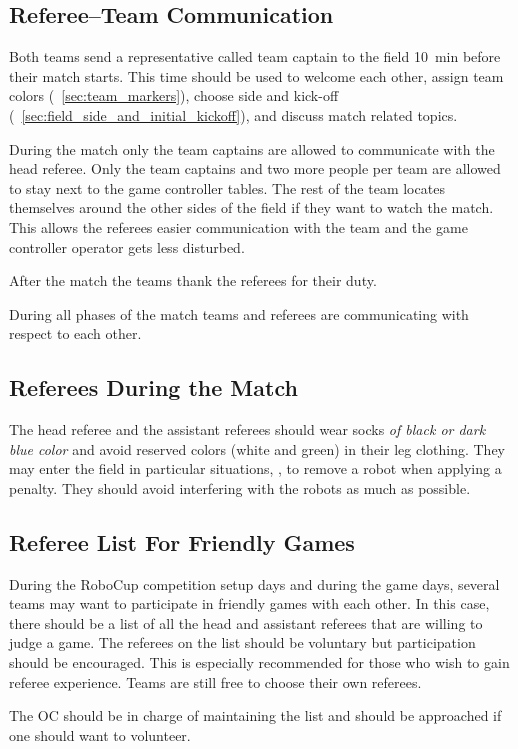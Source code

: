\subsection{Referee--Team Communication}
\label{sec:referee_team_communication}

Both teams send a representative called team captain to the field \qty{10}{\minute} before their match starts.
This time should be used to welcome each other, assign team colors (\cf~\cref{sec:team_markers}), choose side and kick-off (\cf~\cref{sec:field_side_and_initial_kickoff}), and discuss match related topics.

During the match only the team captains are allowed to communicate with the head referee.
Only the team captains and two more people per team are allowed to stay next to the game controller tables.
The rest of the team locates themselves around the other sides of the field if they want to watch the match.
This allows the referees easier communication with the team and the game controller operator gets less disturbed.

After the match the teams thank the referees for their duty.

During all phases of the match teams and referees are communicating with respect to each other.

\subsection{Referees During the Match}
\label{sec:referee_during_match}

The head referee and the assistant referees should wear socks \emph{of black or dark blue color} and avoid reserved colors (white and green) in their leg clothing.
They may enter the field in particular situations, \eg, to remove a robot when applying a penalty.
They should avoid interfering with the robots as much as possible.

\subsection{Referee List For Friendly Games}
\label{sec:referee_list}

During the RoboCup competition setup days and during the game days, several teams may want to participate in friendly games with each other.
In this case, there should be a list of all the head and assistant referees that are willing to judge a game.
The referees on the list should be voluntary but participation should be encouraged.
This is especially recommended for those who wish to gain referee experience.
Teams are still free to choose their own referees.

The OC should be in charge of maintaining the list and should be approached if one should want to volunteer.